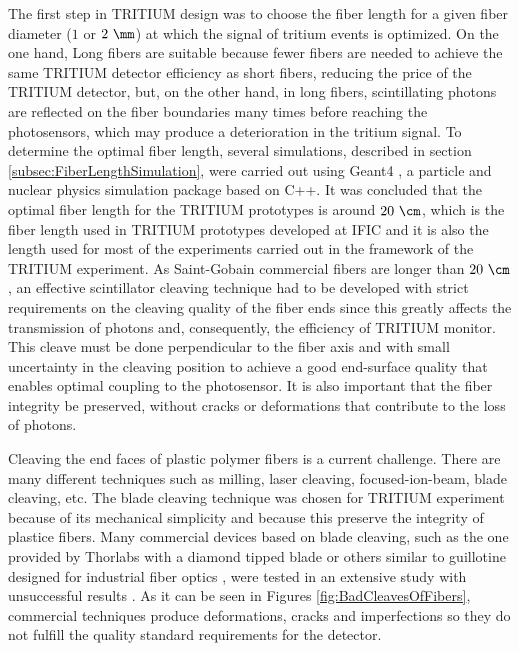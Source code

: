 The first step in TRITIUM design was to choose the fiber length for a given fiber diameter ($1$ or $2~\mm$) at which the signal of tritium events is optimized. On the one hand, Long fibers are suitable because fewer fibers are needed to achieve the same TRITIUM detector efficiency as short fibers, reducing the price of the TRITIUM detector, but, on the other hand, in long fibers, scintillating photons are reflected on the fiber boundaries many times before reaching the photosensors, which may produce a deterioration in the tritium signal. To determine the optimal fiber length, several simulations, described in section \ref{subsec:FiberLengthSimulation}, were carried out using Geant4 \cite{Geant4WebPage}, a particle and nuclear physics simulation package based on C++. It was concluded that the optimal fiber length for the TRITIUM prototypes is around $20~\cm$, which is the fiber length used in TRITIUM prototypes developed at IFIC and it is also the length used for most of the experiments carried out in the framework of the TRITIUM experiment. As Saint-Gobain commercial fibers are longer than $20~\cm$, an effective scintillator cleaving technique had to be developed with strict requirements on the cleaving quality of the fiber ends since this greatly affects the transmission of photons and, consequently, the efficiency of TRITIUM monitor. This cleave must be done perpendicular to the fiber axis and with small uncertainty in the cleaving position to achieve a good end-surface quality that enables optimal coupling to the photosensor. It is also important that the fiber integrity be preserved, without cracks or deformations that contribute to the loss of photons. 

Cleaving the end faces of plastic polymer fibers is a current challenge. There are many different techniques such as milling, laser cleaving, focused-ion-beam, blade cleaving, etc. The blade cleaving technique was chosen for TRITIUM experiment because of its mechanical simplicity and because this preserve the integrity of plastice fibers. Many commercial devices based on blade cleaving, such as the one provided by Thorlabs with a diamond tipped blade \cite{DiamondThorlabs} or others similar to guillotine designed for industrial fiber optics \cite{GuillotineIFO}, were tested in an extensive study with unsuccessful results \cite{TFGAlberto}. As it can be seen in Figures \ref{fig:BadCleavesOfFibers}, commercial techniques produce deformations, cracks and imperfections so they do not fulfill the quality standard requirements for the detector.

